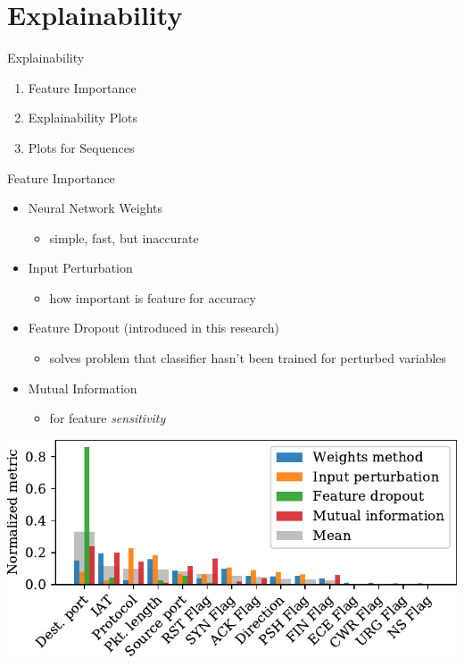 \documentclass{beamer}
\begin{document}
\section{Explainability}
\begin{frame}{Explainability}
\begin{enumerate}
\item Feature Importance \vspace{10pt}
\item Explainability Plots \vspace{10pt}
\item Plots for Sequences
\end{enumerate}
\end{frame}

\begin{frame}{Feature Importance}
\begin{itemize}
\item Neural Network Weights
\begin{itemize}
\item simple, fast, but inaccurate
\end{itemize}
\item Input Perturbation
\begin{itemize}
\item how important is feature for accuracy
\end{itemize}
\item Feature Dropout {\footnotesize (introduced in this research) }
\begin{itemize}
\item solves problem that classifier hasn't been trained for perturbed variables
\end{itemize}
\item Mutual Information
\begin{itemize}
\item for feature \textit{sensitivity}
\end{itemize}
\end{itemize}
\vspace*{-1cm}\hspace{5cm}\includegraphics[width=0.6\columnwidth]{../plots/importance/feat_imp_flow_2017.pdf}
\end{frame}
\end{document}
